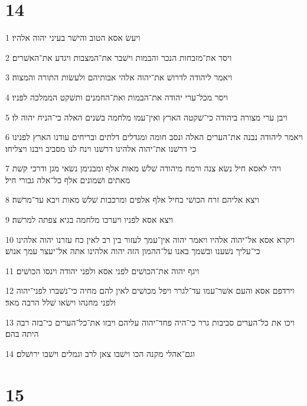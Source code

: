 \chapter{14}

\par 1 ויעשׂ אסא הטוב והישׁר בעיני יהוה אלהיו׃
\par 2 ויסר את־מזבחות הנכר והבמות וישׁבר את־המצבות ויגדע את־האשׁרים׃
\par 3 ויאמר ליהודה לדרושׁ את־יהוה אלהי אבותיהם ולעשׂות התורה והמצוה׃
\par 4 ויסר מכל־ערי יהודה את־הבמות ואת־החמנים ותשׁקט הממלכה לפניו׃
\par 5 ויבן ערי מצורה ביהודה כי־שׁקטה הארץ ואין־עמו מלחמה בשׁנים האלה כי־הניח יהוה לו׃
\par 6 ויאמר ליהודה נבנה את־הערים האלה ונסב חומה ומגדלים דלתים ובריחים עודנו הארץ לפנינו כי דרשׁנו את־יהוה אלהינו דרשׁנו וינח לנו מסביב ויבנו ויצליחו׃
\par 7 ויהי לאסא חיל נשׂא צנה ורמח מיהודה שׁלשׁ מאות אלף ומבנימן נשׂאי מגן ודרכי קשׁת מאתים ושׁמונים אלף כל־אלה גבורי חיל׃
\par 8 ויצא אליהם זרח הכושׁי בחיל אלף אלפים ומרכבות שׁלשׁ מאות ויבא עד־מרשׁה׃
\par 9 ויצא אסא לפניו ויערכו מלחמה בגיא צפתה למרשׁה׃
\par 10 ויקרא אסא אל־יהוה אלהיו ויאמר יהוה אין־עמך לעזור בין רב לאין כח עזרנו יהוה אלהינו כי־עליך נשׁענו ובשׁמך באנו על־ההמון הזה יהוה אלהינו אתה אל־יעצר עמך אנושׁ׃
\par 11 ויגף יהוה את־הכושׁים לפני אסא ולפני יהודה וינסו הכושׁים׃
\par 12 וירדפם אסא והעם אשׁר־עמו עד־לגרר ויפל מכושׁים לאין להם מחיה כי־נשׁברו לפני־יהוה ולפני מחנהו וישׂאו שׁלל הרבה מאד׃
\par 13 ויכו את כל־הערים סביבות גרר כי־היה פחד־יהוה עליהם ויבזו את־כל־הערים כי־בזה רבה היתה בהם׃
\par 14 וגם־אהלי מקנה הכו וישׁבו צאן לרב וגמלים וישׁבו ירושׁלם׃

\chapter{15}

